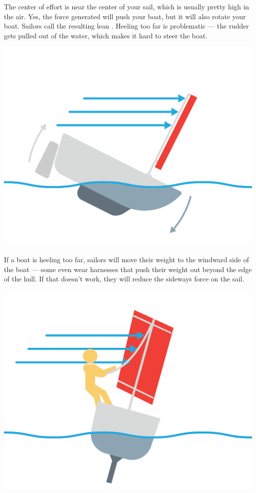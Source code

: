 The center of effort is near the center of your sail,  which is usually pretty high in the air. Yes, the force generated will push your boat,  but it will also rotate your boat.  Sailors call
the resulting lean . Heeling too far is problematic --- the rudder gets pulled out of the water, which makes it hard to steer the boat.

\begin{center}
    \includegraphics[width=.75\textwidth]{heeling.png}
    
\end{center}

If a boat is heeling too far,  sailors will move their weight to the windward side of the boat --- some even wear harnesses that push their weight out beyond the edge of the hull.  
If that doesn't work, they will reduce the sideways force on the sail.

\begin{center}
    \includegraphics[width=.75\textwidth]{heeling2.png}
    
\end{center}

